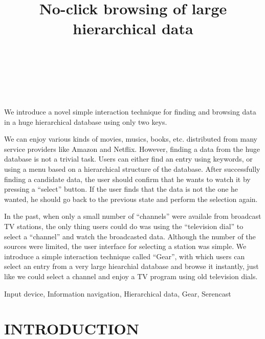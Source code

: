\documentclass{article}
\begin{document}
\title{No-click browsing of large hierarchical data}
\author{
\begin{tabular}{l}
\parbox{5.5cm}{
\begin{center}
~ \\
~ \\
~
\end{center}
}
\end{tabular}
}
\maketitle
\abstract

We introduce a novel simple interaction technique for finding and browsing
data in a huge hierarchical database using only two keys.

We can enjoy various kinds of movies, musics, books,
etc. distributed from many service providers like Amazon and Netflix.
However, 
finding a data from the huge database is not a trivial task. Users can
either find an entry using keywords, or using a menu based
on a hierarchical structure of the database.
After successfully finding a candidate data,
the user should confirm that he wants to watch it by pressing a ``select'' button.
If the user finds that the data is not the one he wanted,
he should go back to the previous state and perform the selection again.

In the past, when only a small number of ``channels'' were availale
from broadcast TV stations, the only thing users could do was
using the ``television dial'' to select a ``channel'' and watch the
broadcasted data.
Although the number of the sources were limited,
the user interface for selecting a station was simple.
%
We introduce a simple interaction technique called ``Gear'',
with which users can select an entry from a very large hiearchial database and
browse it instantly, just like we could select a channel and enjoy a TV program
using old television dials.

\keywords Input device, Information navigation, Hierarchical data, Gear, Serencast


\section*{INTRODUCTION}
\end{document}
